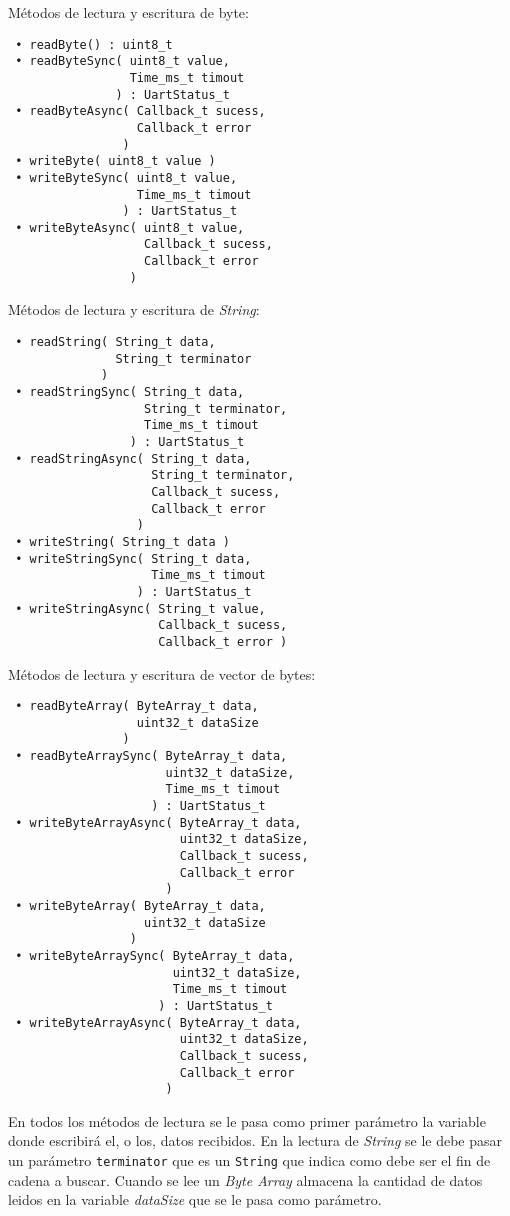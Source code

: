 
Métodos de lectura y escritura de byte:

\begin{verbatim}
 • readByte() : uint8_t
 • readByteSync( uint8_t value, 
                 Time_ms_t timout
               ) : UartStatus_t
 • readByteAsync( Callback_t sucess, 
                  Callback_t error 
                )
 • writeByte( uint8_t value )
 • writeByteSync( uint8_t value, 
                  Time_ms_t timout 
                ) : UartStatus_t
 • writeByteAsync( uint8_t value, 
                   Callback_t sucess,
                   Callback_t error 
                 )
\end{verbatim}

Métodos de lectura y escritura de \emph{String}:

\begin{verbatim}
 • readString( String_t data, 
               String_t terminator
             )
 • readStringSync( String_t data, 
                   String_t terminator,
                   Time_ms_t timout 
                 ) : UartStatus_t
 • readStringAsync( String_t data, 
 	                String_t terminator,
                    Callback_t sucess, 
                    Callback_t error 
                  ) 
 • writeString( String_t data )
 • writeStringSync( String_t data,
                    Time_ms_t timout
                  ) : UartStatus_t
 • writeStringAsync( String_t value, 
                     Callback_t sucess,
                     Callback_t error )
\end{verbatim}

Métodos de lectura y escritura de vector de bytes:

\begin{verbatim}
 • readByteArray( ByteArray_t data, 
                  uint32_t dataSize
                )
 • readByteArraySync( ByteArray_t data, 
                      uint32_t dataSize,
                      Time_ms_t timout
                    ) : UartStatus_t
 • writeByteArrayAsync( ByteArray_t data, 
                        uint32_t dataSize,
                        Callback_t sucess,
                        Callback_t error 
                      )
 • writeByteArray( ByteArray_t data, 
                   uint32_t dataSize
                 )
 • writeByteArraySync( ByteArray_t data, 
                       uint32_t dataSize, 
                       Time_ms_t timout
                     ) : UartStatus_t
 • writeByteArrayAsync( ByteArray_t data, 
                        uint32_t dataSize,
                        Callback_t sucess,
                        Callback_t error
                      )
\end{verbatim}

En todos los métodos de lectura se le pasa como primer parámetro la variable donde escribirá el, o los, datos recibidos. En la lectura de \emph{String} se le debe pasar un parámetro \texttt{terminator} que es un \texttt{String} que indica como debe ser el fin de cadena a buscar. Cuando se lee un \emph{Byte Array} almacena la cantidad de datos leidos en la variable \emph{dataSize} que se le pasa como parámetro.
